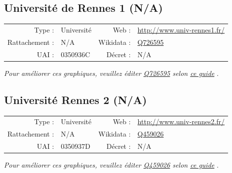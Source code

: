 \documentclass[11pt,french,landscape]{article}
\begin{document}
\newpage

\hypertarget{universituxe9-de-rennes-1-na}{%
\subsection{Université de Rennes 1
(N/A)}\label{universituxe9-de-rennes-1-na}}

\begin{tabular*}{0.45\textwidth}{rp{2cm}rl}  
\hline  
Type : & Université & Web : &\href{http://www.univ-rennes1.fr/}{http://www.univ-rennes1.fr/} \\  
Rattachement : & N/A & Wikidata : & \href{https://www.wikidata.org/entity/Q726595}{Q726595} \\  
UAI : & 0350936C & Décret : & N/A \\  
\hline  
\end{tabular*}

\textit{\scriptsize Pour améliorer ces graphiques, veuillez éditer \href{https://www.wikidata.org/entity/Q726595}{Q726595}  selon \href{https://github.com/cpesr/wikidataESR/blob/master/Rmd/wikidataESR.md}{ce guide}}
.


\newpage

\hypertarget{universituxe9-rennes-2-na}{%
\subsection{Université Rennes 2 (N/A)}\label{universituxe9-rennes-2-na}}

\begin{tabular*}{0.45\textwidth}{rp{2cm}rl}  
\hline  
Type : & Université & Web : &\href{http://www.univ-rennes2.fr/}{http://www.univ-rennes2.fr/} \\  
Rattachement : & N/A & Wikidata : & \href{https://www.wikidata.org/entity/Q459026}{Q459026} \\  
UAI : & 0350937D & Décret : & N/A \\  
\hline  
\end{tabular*}

\textit{\scriptsize Pour améliorer ces graphiques, veuillez éditer \href{https://www.wikidata.org/entity/Q459026}{Q459026}  selon \href{https://github.com/cpesr/wikidataESR/blob/master/Rmd/wikidataESR.md}{ce guide}}
.

\end{document}
